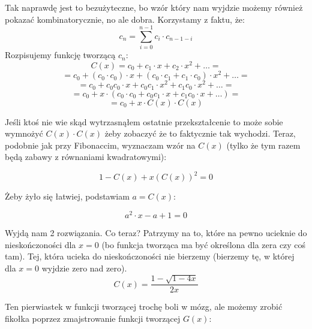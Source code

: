 Tak naprawdę jest to bezużyteczne, bo wzór który nam wyjdzie możemy również pokazać kombinatorycznie, no ale dobra. Korzystamy z faktu, że:
\begin{equation*}
	c_n = \sum_{i = 0}^{n-1} c_i \cdot c_{n-1 - i}
\end{equation*}
Rozpisujemy funkcję tworzącą \(c_n\):
\begin{equation*}
	C(x) = c_0 + c_1 \cdot x + c_2 \cdot x^2 + \dots =
\end{equation*}
\begin{equation*}
	= c_0 + (c_0 \cdot c_0) \cdot x + (c_0 \cdot c_1 + c_1 \cdot c_0) \cdot x^2 + \dots =
\end{equation*}
\begin{equation*}
	= c_0 + c_0 c_0\cdot x + c_0c_1 \cdot x^2 + c_1c_0 \cdot x^2 + \dots =
\end{equation*}
\begin{equation*}
	= c_0 + x \cdot (c_0 \cdot c_0 + c_0c_1 \cdot x + c_1c_0 \cdot x + \dots ) =
\end{equation*}
\begin{equation*}
	= c_0 + x \cdot C(x) \cdot C(x)
\end{equation*}

Jeśli ktoś nie wie skąd wytrzasnąłem ostatnie przekształcenie to może sobie wymnożyć \(C(x) \cdot C(x)\) żeby zobaczyć że to faktycznie tak wychodzi. Teraz, podobnie jak przy Fibonaccim, wyznaczam wzór na \(C(x)\) (tylko że tym razem będą zabawy z równaniami kwadratowymi):

\begin{equation*}
	1 - C(x) + x(C(x))^2 = 0
\end{equation*}

Żeby żyło się łatwiej, podstawiam \(a = C(x)\):

\begin{equation*}
	a^2 \cdot x - a + 1 = 0
\end{equation*}

Wyjdą nam 2 rozwiązania. Co teraz? Patrzymy na to, które na pewno ucieknie do nieskończoności dla \(x = 0\) (bo funkcja tworząca ma być określona dla zera czy coś tam). Tej, która ucieka do nieskończoności nie bierzemy (bierzemy tę, w której dla \(x=0\) wyjdzie zero nad zero).
\begin{equation*}
	C(x) = \frac{1 - \sqrt{1 - 4x}} {2x}
\end{equation*}

Ten pierwiastek w funkcji tworzącej trochę boli w mózg, ale możemy zrobić fikołka poprzez zmajstrowanie funkcji tworzącej \(G(x)\):

